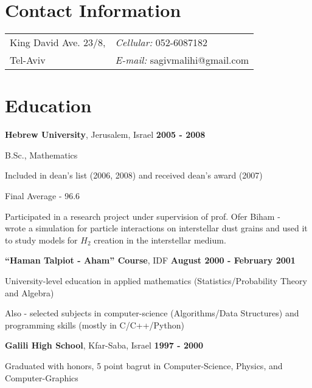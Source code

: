 \documentclass[margin,line]{res}
\newenvironment{list1}{
  \begin{list}{\ding{113}}{%
      \setlength{\itemsep}{0in}
      \setlength{\parsep}{0in} \setlength{\parskip}{0in}
      \setlength{\topsep}{0in} \setlength{\partopsep}{0in} 
      \setlength{\leftmargin}{0.2in}}}{\end{list}}
\begin{document}

\begin{resume}
\section{\sc Contact Information}
\vspace{.05in}
\begin{tabular}{@{}p{2in}p{4in}}
King David Ave. 23/8,       & {\it Cellular:}  052-6087182 \\
Tel-Aviv           & {\it E-mail:}  sagivmalihi@gmail.com \\
\end{tabular}

\section{\sc Education}
{\bf Hebrew University}, Jerusalem, Israel \hfill {\bf 2005 - 2008} \\
\vspace*{-.1in}
\begin{list1}
\item[] B.Sc., Mathematics
\item[] Included in dean's list (2006, 2008) and received dean's award (2007)
\item[] Final Average - 96.6
\item[] Participated in a research project under supervision of prof. Ofer Biham - \\ 
        wrote a simulation for particle interactions on interstellar dust grains 
        and used it to study models for $H_2$ creation in the interstellar medium.
\end{list1}

{\bf ``Haman Talpiot - Aham'' Course}, IDF \hfill {\bf August 2000 - February 2001}\\
\vspace*{-.1in}
\begin{list1}
\item[] University-level education in applied mathematics (Statistics/Probability Theory and Algebra)
\item[] Also - selected subjects in computer-science (Algorithms/Data Structures) and programming skills (mostly in C/C++/Python)
\end{list1}

{\bf Galili High School}, Kfar-Saba, Israel \hfill {\bf 1997 - 2000}\\
\vspace*{-.1in}
\begin{list1}
\item[] Graduated with honors, 5 point bagrut in Computer-Science, Physics, and Computer-Graphics
\end{list1}



\end{resume}
\end{document}
